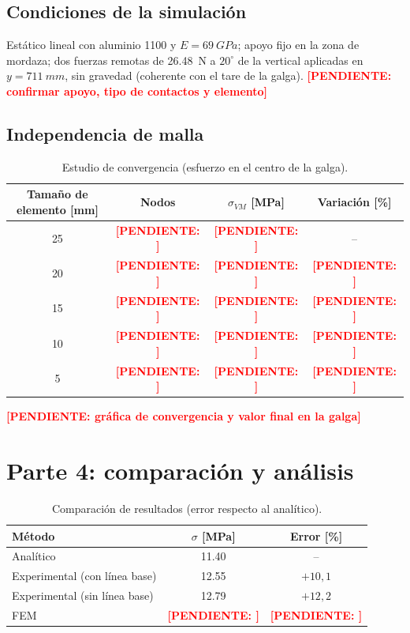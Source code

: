 \documentclass[11pt,a4paper]{article}
\newcommand{\pend}[1]{\textcolor{red}{\textbf{[PENDIENTE: #1]}}}
\begin{document}
\subsection{Condiciones de la simulaci\'on}
Est\'atico lineal con aluminio 1100 y $E=\SI{69}{GPa}$; apoyo fijo en la zona de mordaza; dos fuerzas remotas de \SI{26,48}{N} a $20^\circ$ de la vertical aplicadas en $y=\SI{711}{mm}$, sin gravedad (coherente con el tare de la galga). \pend{confirmar apoyo, tipo de contactos y elemento}

\subsection{Independencia de malla}
\begin{table}[H]
\centering
\caption{Estudio de convergencia (esfuerzo en el centro de la galga).}
\begin{tabular}{@{}cccc@{}}
\toprule
Tama\~no de elemento [mm] & Nodos & $\sigma_{VM}$ [MPa] & Variaci\'on [\%] \\
\midrule
25 & \pend{} & \pend{} & -- \\
20 & \pend{} & \pend{} & \pend{} \\
15 & \pend{} & \pend{} & \pend{} \\
10 & \pend{} & \pend{} & \pend{} \\
5 & \pend{} & \pend{} & \pend{} \\
\bottomrule
\end{tabular}
\end{table}
\pend{gr\'afica de convergencia y valor final en la galga}

\section{Parte 4: comparaci\'on y an\'alisis}
\begin{table}[H]
\centering
\caption{Comparaci\'on de resultados (error respecto al anal\'itico).}
\begin{tabular}{@{}lcc@{}}
\toprule
M\'etodo & $\sigma$ [MPa] & Error [\%] \\
\midrule
Anal\'itico & \SI{11,40}{} & -- \\
Experimental (con l\'inea base) & \SI{12,55}{} & $+10{,}1$ \\
Experimental (sin l\'inea base) & \SI{12,79}{} & $+12{,}2$ \\
FEM & \pend{} & \pend{} \\
\bottomrule
\end{tabular}
\end{table}
\end{document}
